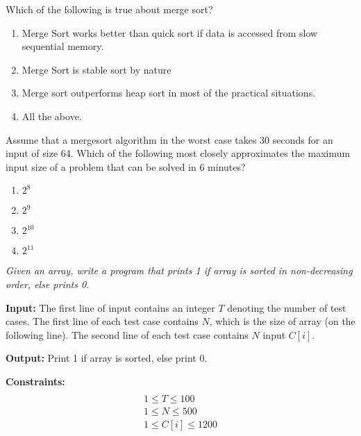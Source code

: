 \begin{problem}
Which of the following is true about merge sort?
\begin{enumerate}
\item Merge Sort works better than quick sort if data is accessed from slow sequential memory.
\item Merge Sort is stable sort by nature
\item Merge sort outperforms heap sort in most of the practical situations.
\item All the above.
\end{enumerate}

\end{problem}


\begin{problem}
Assume that a mergesort algorithm in the worst case takes 30 seconds for an input of size 64. Which of the following most closely approximates the maximum input size of a problem that can be solved in 6 minutes?
\begin{enumerate}
\item $2^8$
\item $2^9$
\item $2^{10}$
\item $2^{11}$
\end{enumerate}

\end{problem}



\begin{problem}
\textit{Given an array, write a program that prints 1 if array is sorted in non-decreasing order, else prints 0.}

\textbf{Input:}
The first line of input contains an integer $T$ denoting the number of test cases.
The first line of each test case contains $N$, which is the size of array (on the following line).
The second line of each test case contains $N$ input $C[i]$.

\textbf{Output:}
Print 1 if array is sorted, else print 0.

\textbf{Constraints:}
\begin{multline}\\
1 \leq T \leq 100\\
1 \leq N \leq 500\\
1 \leq C[i] \leq 1200\\
\end{multline}
\end{problem}

